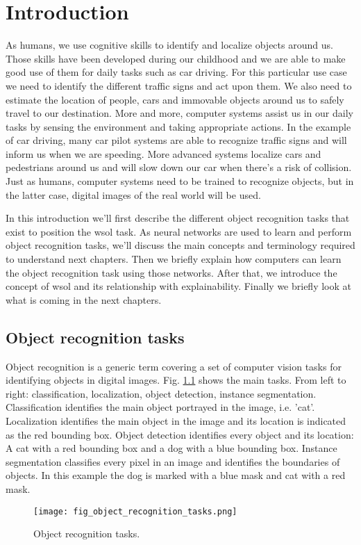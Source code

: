 \chapter{Introduction}

As humans, we use cognitive skills to identify and localize objects around us. Those skills have been developed during our childhood and we are able to make good use of them for daily tasks such as car driving. For this particular use case we need to identify the different traffic signs and act upon them. We also need to estimate the location of people, cars and immovable objects around us to safely travel to our destination. More and more, computer systems assist us in our daily tasks by sensing the environment and taking appropriate actions. In the example of car driving, many car pilot systems are able to recognize traffic signs and will inform us when we are speeding. More advanced systems localize cars and pedestrians around us and will slow down our car when there's a risk of collision. Just as humans, computer systems need to be trained to recognize objects, but in the latter case, digital images of the real world will be used.

In this introduction we'll first describe the different object recognition tasks that exist to position the \acrfull{wsol} task. As neural networks are used to learn and perform object recognition tasks, we'll discuss the main concepts and terminology required to understand next chapters. Then we briefly explain how computers can learn the object recognition task using those networks. After that, we introduce the concept of \acrlong{wsol} and its relationship with explainability. Finally we briefly look at what is coming in the next chapters.

\section{Object recognition tasks}
Object recognition is a generic term covering a set of computer vision tasks for identifying objects in digital images. Fig. \ref{fig:object_recognition_tasks} shows the main tasks. From left to right: classification, localization, object detection, instance segmentation. Classification identifies the main object portrayed in the image, i.e. 'cat'. Localization identifies the main object in the image and its location is indicated as the red bounding box. Object detection identifies every object and its location: A cat with a red bounding box and a dog with a blue bounding box. Instance segmentation classifies every pixel in an image and identifies the boundaries of objects. In this example the dog is marked with a blue mask and cat with a red mask.
\begin{figure}[ht]
    \begin{center}
    \texttt{[image: fig\_object\_recognition\_tasks.png]}
    \caption{Object recognition tasks.}
    \label{fig:object_recognition_tasks}
    \end{center}
\end{figure}

